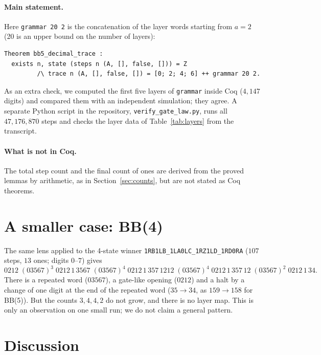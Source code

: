 \documentclass[11pt]{article}
\theoremstyle{definition}
\theoremstyle{remark}
\newcommand{\coq}[1]{\texttt{#1}}
\begin{document}
\paragraph{Main statement.} Here \coq{grammar 20 2} is the concatenation of the layer
words starting from $a=2$ (20 is an upper bound on the number of layers):
\begin{lstlisting}
Theorem bb5_decimal_trace :
  exists n, state (steps n (A, [], false, [])) = Z
         /\ trace n (A, [], false, []) = [0; 2; 4; 6] ++ grammar 20 2.
\end{lstlisting}
As an extra check, we computed the first five layers of \coq{grammar} inside Coq
($4{,}147$ digits) and compared them with an independent simulation; they agree. A
separate Python script in the repository, \coq{verify\_gate\_law.py}, runs all
$47{,}176{,}870$ steps and checks the layer data of Table~\ref{tab:layers} from the
transcript.

\paragraph{What is not in Coq.} The total step count and the final count of ones are
derived from the proved lemmas by arithmetic, as in Section~\ref{sec:counts}, but are
not stated as Coq theorems.

\section{A smaller case: BB(4)}

The same lens applied to the 4-state winner
\texttt{1RB1LB\_1LA0LC\_1RZ1LD\_1RD0RA} ($107$ steps, $13$ ones; digits $0$--$7$)
gives
\[
0212\;(03567)^3\;0212\,1\,3567\;(03567)^4\;0212\,1\,357\,1212\;(03567)^4\;
0212\,1\,357\,12\;(03567)^2\;0212\,1\,34 .
\]
There is a repeated word ($03567$), a gate-like opening ($0212$) and a halt by a change
of one digit at the end of the repeated word ($35\to34$, as $159\to158$ for BB(5)). But
the counts $3,4,4,2$ do not grow, and there is no layer map. This is only an
observation on one small run; we do not claim a general pattern.

\section{Discussion}
\end{document}
